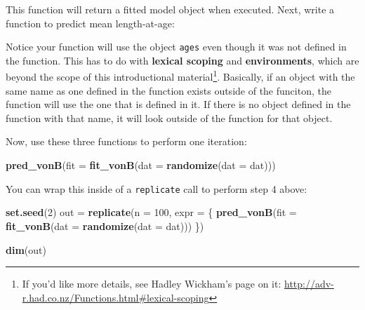 \documentclass[]{book}
\newenvironment{Shaded}{\begin{snugshade}}{\end{snugshade}}
\newcommand{\KeywordTok}[1]{\textcolor[rgb]{0.13,0.29,0.53}{\textbf{#1}}}
\newcommand{\DataTypeTok}[1]{\textcolor[rgb]{0.13,0.29,0.53}{#1}}
\newcommand{\DecValTok}[1]{\textcolor[rgb]{0.00,0.00,0.81}{#1}}
\newcommand{\StringTok}[1]{\textcolor[rgb]{0.31,0.60,0.02}{#1}}
\newcommand{\CommentTok}[1]{\textcolor[rgb]{0.56,0.35,0.01}{\textit{#1}}}
\newcommand{\ControlFlowTok}[1]{\textcolor[rgb]{0.13,0.29,0.53}{\textbf{#1}}}
\newcommand{\OperatorTok}[1]{\textcolor[rgb]{0.81,0.36,0.00}{\textbf{#1}}}
\newcommand{\NormalTok}[1]{#1}
\let\rmarkdownfootnote\footnote%
\def\footnote{\protect\rmarkdownfootnote}
\theoremstyle{definition}
\theoremstyle{definition}
\theoremstyle{definition}
\theoremstyle{remark}
\begin{document}
This function will return a fitted model object when executed. Next,
write a function to predict mean length-at-age:

\begin{Shaded}
\end{Shaded}

Notice your function will use the object \texttt{ages} even though it
was not defined in the function. This has to do with \textbf{lexical
scoping} and \textbf{environments}, which are beyond the scope of this
introductional material\footnote{If you'd like more details, see Hadley
  Wickham's page on it:
  \url{http://adv-r.had.co.nz/Functions.html\#lexical-scoping}}.
Basically, if an object with the same name as one defined in the
function exists outside of the funciton, the function will use the one
that is defined in it. If there is no object defined in the function
with that name, it will look outside of the function for that object.

Now, use these three functions to perform one iteration:

\begin{Shaded}
\begin{Highlighting}[]
\KeywordTok{pred_vonB}\NormalTok{(}\DataTypeTok{fit =} \KeywordTok{fit_vonB}\NormalTok{(}\DataTypeTok{dat =} \KeywordTok{randomize}\NormalTok{(}\DataTypeTok{dat =}\NormalTok{ dat)))}
\end{Highlighting}
\end{Shaded}

You can wrap this inside of a \texttt{replicate} call to perform step 4
above:

\begin{Shaded}
\begin{Highlighting}[]
\KeywordTok{set.seed}\NormalTok{(}\DecValTok{2}\NormalTok{)}
\NormalTok{out =}\StringTok{ }\KeywordTok{replicate}\NormalTok{(}\DataTypeTok{n =} \DecValTok{100}\NormalTok{, }\DataTypeTok{expr =}\NormalTok{ \{}
  \KeywordTok{pred_vonB}\NormalTok{(}\DataTypeTok{fit =} \KeywordTok{fit_vonB}\NormalTok{(}\DataTypeTok{dat =} \KeywordTok{randomize}\NormalTok{(}\DataTypeTok{dat =}\NormalTok{ dat)))}
\NormalTok{\})}

\KeywordTok{dim}\NormalTok{(out)}
\end{Highlighting}
\end{Shaded}
\end{document}

